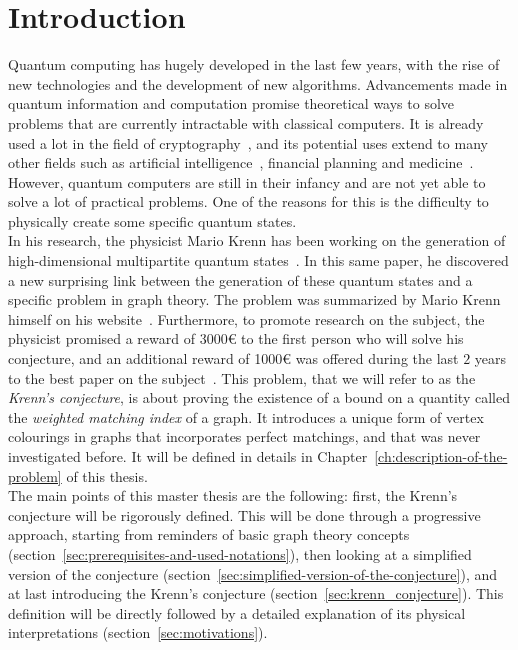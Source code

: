 \setcounter{secnumdepth}{-1}

\chapter{Introduction}
\label{ch:introduction}

Quantum computing has hugely developed in the last few years, with the rise of new technologies and the development of new algorithms.
Advancements made in quantum information and computation promise theoretical ways to solve problems that are currently intractable with classical computers.
It is already used a lot in the field of cryptography~\cite{kumar2021state}, and its potential uses extend to many other fields such as artificial intelligence~\cite{otterbach2017unsupervised}, financial planning and medicine~\cite{hassija2020forthcoming}.
However, quantum computers are still in their infancy and are not yet able to solve a lot of practical problems.
One of the reasons for this is the difficulty to physically create some specific quantum states.\\

In his research, the physicist Mario Krenn has been working on the generation of high-dimensional multipartite quantum states~\cite{Krenn_2017}.
In this same paper, he discovered a new surprising link between the generation of these quantum states and a specific problem in graph theory.
The problem was summarized by Mario Krenn himself on his website~\cite{wordpress}.
Furthermore, to promote research on the subject, the physicist promised a reward of 3000€ to the first person who will solve his conjecture, and an additional reward of 1000€ was offered during the last $2$ years to the best paper on the subject~\cite{wordpress}.
This problem, that we will refer to as the \textit{Krenn's conjecture}, is about proving the existence of a bound on a quantity called the \textit{weighted matching index} of a graph.
It introduces a unique form of vertex colourings in graphs that incorporates perfect matchings, and that was never investigated before.
It will be defined in details in Chapter~\ref{ch:description-of-the-problem} of this thesis.\\

The main points of this master thesis are the following: first, the Krenn's conjecture will be rigorously defined.
This will be done through a progressive approach, starting from reminders of basic graph theory concepts (section~\ref{sec:prerequisites-and-used-notations}), then looking at a simplified version of the conjecture (section~\ref{sec:simplified-version-of-the-conjecture}), and at last introducing the Krenn's conjecture (section~\ref{sec:krenn_conjecture}).
This definition will be directly followed by a detailed explanation of its physical interpretations (section~\ref{sec:motivations}).\\

